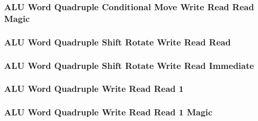 \subsubsection[{\small ALU Word Quadruple Conditional Move Write Read Read Magic}]{ALU Word Quadruple Conditional Move Write Read Read Magic} \label{sec:format-ALU-WQCMWRR.M}



\subsubsection[{\small ALU Word Quadruple Shift Rotate Write Read Read}]{ALU Word Quadruple Shift Rotate Write Read Read} \label{sec:format-ALU-WQSWRR}



\subsubsection[{\small ALU Word Quadruple Shift Rotate Write Read Immediate}]{ALU Word Quadruple Shift Rotate Write Read Immediate} \label{sec:format-ALU-WQSWRI}



\subsubsection[{\small ALU Word Quadruple Write Read Read 1}]{ALU Word Quadruple Write Read Read 1} \label{sec:format-ALU-WQWRR1}



\subsubsection[{\small ALU Word Quadruple Write Read Read 1 Magic}]{ALU Word Quadruple Write Read Read 1 Magic} \label{sec:format-ALU-WQWRR1.M}




